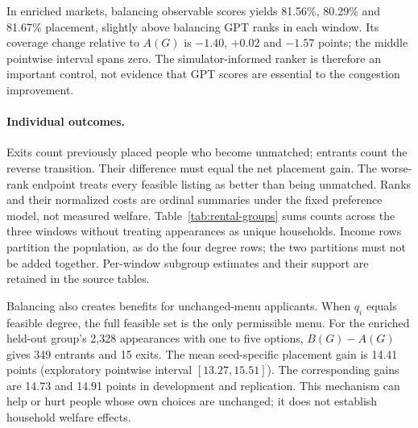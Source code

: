 \begin{table}[ht]\centering\small
\caption{A model-informed score anchor versus the original GPT anchor,
$A_s(G)-A(G)$. Percentage points with exploratory pointwise intervals.
These gains show that the balancing comparison is not an inherent
prediction--placement impossibility.}\label{tab:rental-score}

\end{table}

In enriched markets, balancing observable scores yields 81.56\%, 80.29\%
and 81.67\% placement, slightly above balancing GPT ranks in each window.
Its coverage change relative to $A(G)$ is $-1.40$, $+0.02$ and $-1.57$
points; the middle pointwise interval spans zero. The simulator-informed
ranker is therefore an important control, not evidence that GPT scores
are essential to the congestion improvement.

\paragraph{Individual outcomes.}
Exits count previously placed people who become unmatched; entrants count
the reverse transition. Their difference must equal the net placement gain.
The worse-rank endpoint treats every feasible listing as better than being
unmatched. Ranks and their normalized costs are ordinal summaries under the
fixed preference model, not measured welfare. Table~\ref{tab:rental-groups}
sums counts across the three windows without treating appearances as unique
households. Income rows partition the population, as do the four degree rows;
the two partitions must not be added together. Per-window subgroup estimates
and their support are retained in the source tables.

\begin{table}[ht]\centering\small
\caption{Individual transitions under $A(G)-G$, summed descriptively over
the three windows. Worse rank includes exits. Degree means the number of
feasible listings before any menu is chosen.}\label{tab:rental-groups}

\end{table}

Balancing also creates benefits for unchanged-menu applicants. When
$q_i$ equals feasible degree, the full feasible set is the only permissible
menu. For the enriched held-out group's 2,328 appearances with one to five
options, $B(G)-A(G)$ gives 349 entrants and 15 exits. The mean seed-specific
placement gain is 14.41 points (exploratory pointwise interval
$[13.27,15.51]$). The corresponding gains are 14.73 and 14.91 points in
development and replication. This mechanism can help or hurt people whose
own choices are unchanged; it does not establish household welfare effects.

